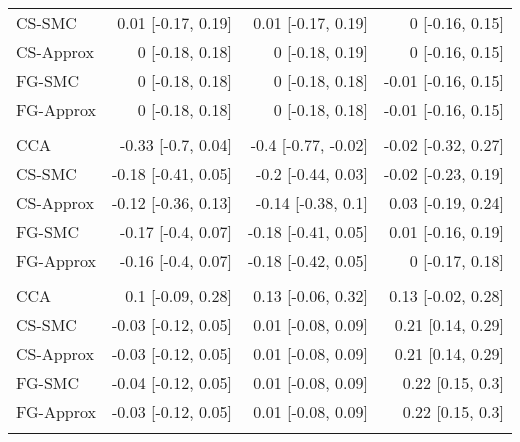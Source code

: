 \documentclass[
  12pt,
  a4paper,
]{article}
\begin{document}
\begin{longtable}[t]{lrrr}
\hspace{1em}CS-SMC & 0.01 [-0.17, 0.19] & 0.01 [-0.17, 0.19] & 0 [-0.16, 0.15]\\
\hspace{1em}CS-Approx & 0 [-0.18, 0.18] & 0 [-0.18, 0.19] & 0 [-0.16, 0.15]\\
\hspace{1em}FG-SMC & 0 [-0.18, 0.18] & 0 [-0.18, 0.18] & -0.01 [-0.16, 0.15]\\
\hspace{1em}FG-Approx & 0 [-0.18, 0.18] & 0 [-0.18, 0.18] & -0.01 [-0.16, 0.15]\\
\addlinespace[0.3em]
\multicolumn{4}{l}{\textbf{Night sweats: yes}}\\
\hspace{1em}CCA & -0.33 [-0.7, 0.04] & -0.4 [-0.77, -0.02] & -0.02 [-0.32, 0.27]\\
\hspace{1em}CS-SMC & -0.18 [-0.41, 0.05] & -0.2 [-0.44, 0.03] & -0.02 [-0.23, 0.19]\\
\hspace{1em}CS-Approx & -0.12 [-0.36, 0.13] & -0.14 [-0.38, 0.1] & 0.03 [-0.19, 0.24]\\
\hspace{1em}FG-SMC & -0.17 [-0.4, 0.07] & -0.18 [-0.41, 0.05] & 0.01 [-0.16, 0.19]\\
\hspace{1em}FG-Approx & -0.16 [-0.4, 0.07] & -0.18 [-0.42, 0.05] & 0 [-0.17, 0.18]\\
\addlinespace[0.3em]
\multicolumn{4}{l}{\textbf{Patient age (decades)}}\\
\hspace{1em}CCA & 0.1 [-0.09, 0.28] & 0.13 [-0.06, 0.32] & 0.13 [-0.02, 0.28]\\
\hspace{1em}CS-SMC & -0.03 [-0.12, 0.05] & 0.01 [-0.08, 0.09] & 0.21 [0.14, 0.29]\\
\hspace{1em}CS-Approx & -0.03 [-0.12, 0.05] & 0.01 [-0.08, 0.09] & 0.21 [0.14, 0.29]\\
\hspace{1em}FG-SMC & -0.04 [-0.12, 0.05] & 0.01 [-0.08, 0.09] & 0.22 [0.15, 0.3]\\
\hspace{1em}FG-Approx & -0.03 [-0.12, 0.05] & 0.01 [-0.08, 0.09] & 0.22 [0.15, 0.3]\\
\addlinespace[0.3em]
\multicolumn{4}{l}{\textbf{Patient sex: male}}\\

\end{longtable}
\end{document}
